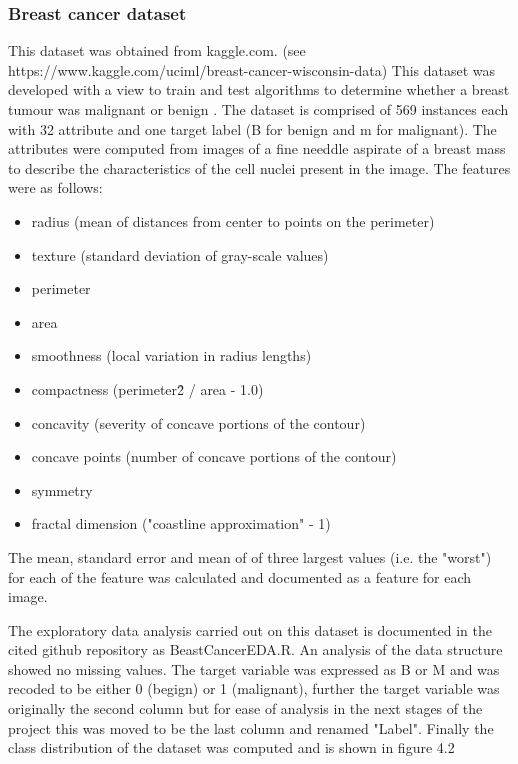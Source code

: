 \subsubsection{Breast cancer dataset}
This dataset was obtained from kaggle.com. \newline
(see https://www.kaggle.com/uciml/breast-cancer-wisconsin-data) \newline
This dataset was developed with a view to train and test algorithms to determine whether a breast tumour was malignant or benign \cite{}. \newline
The dataset is comprised of 569 instances each with 32 attribute and one target label (B for benign and m for malignant).\newline
The attributes were computed from images of a fine needdle aspirate of a breast mass to describe the characteristics of the cell nuclei present in the image. The features were as follows:
\begin{itemize}
    \item radius (mean of distances from center to points on the perimeter)
    \item texture (standard deviation of gray-scale values) 
    \item perimeter 
    \item area 
    \item smoothness (local variation in radius lengths) 
    \item compactness (perimeter\^2 / area - 1.0)
    \item concavity (severity of concave portions of the contour)
    \item concave points (number of concave portions of the contour)
    \item symmetry
    \item fractal dimension ("coastline approximation" - 1)
\end{itemize}
The mean, standard error and mean of of three largest values (i.e. the "worst") for each of the feature was calculated and documented as a feature for each image.\newline

The exploratory data analysis carried out on this dataset is documented in the cited github repository as BeastCancerEDA.R.\newline
An analysis of the data structure showed no missing values. The target variable was expressed as B or M and was recoded to be either 0 (begign) or 1 (malignant), further the target variable was originally the second column but for ease of analysis in the next stages of the project this was moved to be the last column and renamed "Label".
Finally the class distribution of the dataset was computed and is shown in figure 4.2

